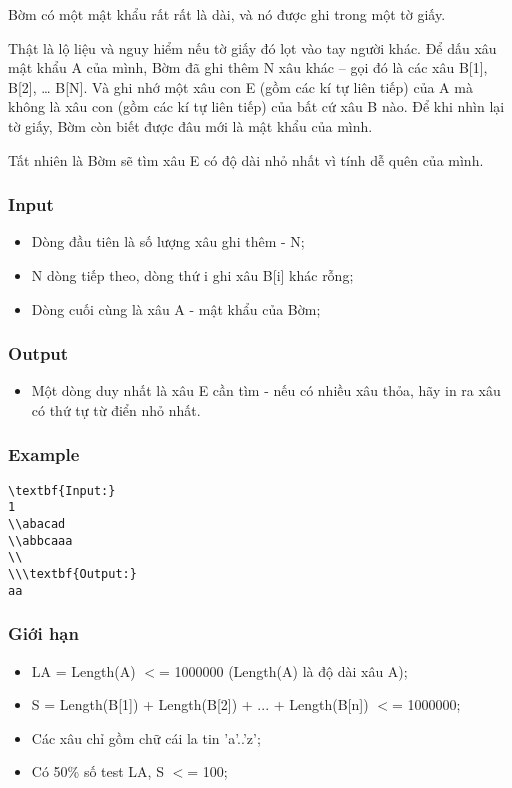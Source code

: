 



   Bờm có một mật khẩu rất rất là dài, và nó được ghi trong một tờ giấy.  

   Thật là lộ liệu và nguy hiểm nếu tờ giấy đó lọt vào tay người khác. Để dấu xâu mật khẩu A của mình, Bờm đã ghi thêm N xâu khác – gọi đó là các xâu B[1], B[2], … B[N]. Và ghi nhớ một xâu con E (gồm các kí tự liên tiếp) của A mà không là xâu con (gồm các kí tự liên tiếp) của bất cứ xâu B nào. Để khi nhìn lại tờ giấy, Bờm còn biết được đâu mới là mật khẩu của mình.  

   Tất nhiên là Bờm sẽ tìm xâu E có độ dài nhỏ nhất vì tính dễ quên của mình.  

\subsubsection{   Input  }
\begin{itemize}
	\item     Dòng đầu tiên là số lượng xâu ghi thêm - N;   
	\item     N dòng tiếp theo, dòng thứ i ghi xâu B[i] khác rỗng;   
	\item     Dòng cuối cùng là xâu A - mật khẩu của Bờm;   
\end{itemize}

\subsubsection{   Output  }
\begin{itemize}
	\item     Một dòng duy nhất là xâu E cần tìm - nếu có nhiều xâu thỏa, hãy in ra xâu có thứ tự từ điển nhỏ nhất.   
\end{itemize}

\subsubsection{   Example  }
\begin{verbatim}
\textbf{Input:}
1
\\abacad
\\abbcaaa
\\
\\\textbf{Output:}
aa\end{verbatim}

\subsubsection{   Giới hạn  }
\begin{itemize}
	\item     LA = Length(A) $<$= 1000000 (Length(A) là độ dài xâu A);   
	\item     S = Length(B[1]) + Length(B[2]) + ... + Length(B[n]) $<$= 1000000;   
	\item     Các xâu chỉ gồm chữ cái la tin 'a'..'z';   
	\item     Có 50\% số test LA, S $<$= 100;   
\end{itemize}